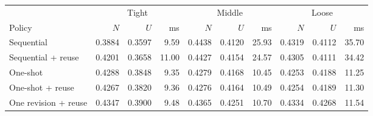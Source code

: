 \begin{tabular}{lrrrrrrrrr}
\toprule
 & \multicolumn{3}{c}{Tight} & \multicolumn{3}{c}{Middle} & \multicolumn{3}{c}{Loose}\\ \cmidrule(lr){2-4}\cmidrule(lr){5-7}\cmidrule(lr){8-10}Policy & $N$ & $U$ & ms & $N$ & $U$ & ms & $N$ & $U$ & ms \\
\midrule
Sequential & 0.3884 & 0.3597 & 9.59 & 0.4438 & 0.4120 & 25.93 & 0.4319 & 0.4112 & 35.70 \\
Sequential + reuse & 0.4201 & 0.3658 & 11.00 & 0.4427 & 0.4154 & 24.57 & 0.4305 & 0.4111 & 34.42 \\
One-shot & 0.4288 & 0.3848 & 9.35 & 0.4279 & 0.4168 & 10.45 & 0.4253 & 0.4188 & 11.25 \\
One-shot + reuse & 0.4267 & 0.3820 & 9.36 & 0.4276 & 0.4164 & 10.49 & 0.4254 & 0.4189 & 11.30 \\
One revision + reuse & 0.4347 & 0.3900 & 9.48 & 0.4365 & 0.4251 & 10.70 & 0.4334 & 0.4268 & 11.54 \\
\bottomrule
\end{tabular}
